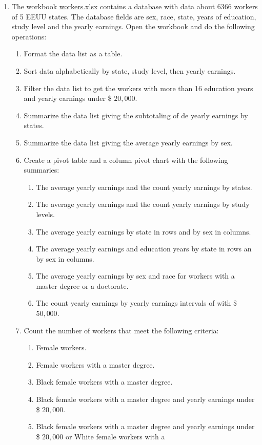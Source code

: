\begin{enumerate}[leftmargin=*,resume]
\item The workbook
\href{http://aprendeconalf.es/office/excel/exercises/databases/workers.xlsx}{\textsf{workers.xlsx}}
contains a database with data about 6366 workers of 5 EEUU states.
The database fields are sex, race, state, years of education, study level and the yearly earnings.
Open the workbook and do the following operations:
\begin{enumerate}
\item Format the data list as a table.
\item Sort data alphabetically by state, study level, then yearly earnings.
\item Filter the data list to get the workers with more than 16 education years and yearly earnings under \$ $20,000$.   
\item Summarize the data list giving the subtotaling of de yearly earnings by states. 
\item Summarize the data list giving the average yearly earnings by sex. 
\item Create a pivot table and a column pivot chart with the following summaries: 
\begin{enumerate}
\item The average yearly earnings and the count yearly earnings by states. 
\item The average yearly earnings and the count yearly earnings by study levels.
\item The average yearly earnings by state in rows and by sex in columns.
\item The average yearly earnings and education years by state in rows an by sex in columns.
\item The average yearly earnings by sex and race for workers with a master degree or a doctorate. 
\item The count yearly earnings by yearly earnings intervals of with \$ $50,000$.
\end{enumerate}
\item Count the number of workers that meet the following criteria:
\begin{enumerate}
\item Female workers.
\item Female workers with a master degree.
\item Black female workers with a master degree.
\item Black female workers with a master degree and yearly earnings under \$ $20,000$.
\item Black female workers with a master degree and yearly earnings under \$ $20,000$ or White female workers with a

\end{enumerate}
\end{enumerate}
\end{enumerate}
